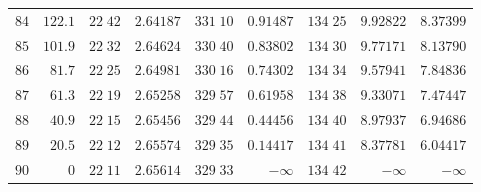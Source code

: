 \begin{center}
\begin{tabular}{r|r|r|r|r|r|r|r|r}
$84$&$122.1$&$22\;42$&$2.64187$&$331\;10$&$0.91487$&$134\;25$&$9.92822$&$8.37399$\\[2pt]
$85$&$101.9$&$22\;32$&$2.64624$&$330\;40$&$0.83802$&$134\;30$&$9.77171$&$8.13790$\\
$86$&$81.7$&$22\;25$&$2.64981$&$330\;16$&$0.74302$&$134\;34$&$9.57941$&$7.84836$\\
$87$&$61.3$&$22\;19$&$2.65258$&$329\;57$&$0.61958$&$134\;38$&$9.33071$&$7.47447$\\
$88$&$40.9$&$22\;15$&$2.65456$&$329\;44$&$0.44456$&$134\;40$&$8.97937$&$6.94686$\\
$89$&$20.5$&$22\;12$&$2.65574$&$329\;35$&$0.14417$&$134\;41$&$8.37781$&$6.04417$\\[2pt]
$90$&$0$&$22\;11$&$2.65614$&$329\;33$&$-\infty$&$134\;42$&$-\infty$&$-\infty$\\
\hline
\end{tabular}
\end{center}
\endgroup
